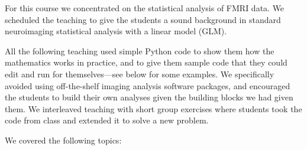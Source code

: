 For this course we concentrated on the statistical analysis of FMRI data.  We
scheduled the teaching to give the students a sound background in standard
neuroimaging statistical analysis with a linear model (GLM).

All the following teaching used simple Python code to show them how the
mathematics works in practice, and to give them sample code that they could
edit and run for themselves---see below for some examples.  We specifically
avoided using off-the-shelf imaging analysis software packages, and encouraged
the students to build their own analyses given the building blocks we had
given them.  We interleaved teaching with short group exercises where students
took the code from class and extended it to solve a new problem.

We covered the following topics:

